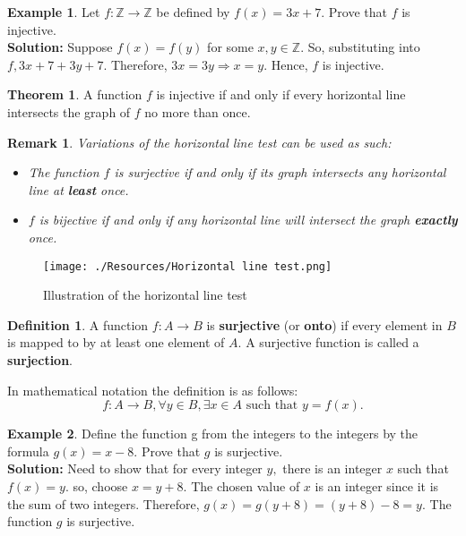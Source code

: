 \documentclass[12pt, a4paper]{article}
\newcommand{\bb}[1]{\mathbb{#1}}
\newcommand{\imply}{\Rightarrow}
\newtheorem*{remark}{Remark}
\theoremstyle{definition}
\newtheorem{definition}{Definition}[section]
\newtheorem{theorem}{Theorem}[section]
\newtheorem*{example}{Example}
\theoremstyle{plain}
\begin{document}
\begin{example}
Let $f : \bb{Z} \to \bb{Z}$ be defined by $f(x) = 3x + 7.$ Prove that $f$ is injective. \\
\textbf{Solution:} Suppose $f(x)=f(y)$ for some $x,y \in \bb{Z}.$ So, substituting into $f, 3x+7+3y+7.$ Therefore, $3x=3y \imply x=y.$ Hence, $f$ is injective. 
\end{example}

\begin{theorem}
A function $f$ is injective if and only if every horizontal line intersects the graph of $f$ no more than once.
\end{theorem}

\begin{remark}
Variations of the horizontal line test can be used as such:
\begin{itemize}

	\item The function $f$ is surjective if and only if its graph intersects any horizontal line at \textbf{least} once.

	\item $f$ is bijective if and only if any horizontal line will intersect the graph \textbf{exactly} once.

\end{itemize}
\end{remark}

\begin{figure}[H]
\centering
\texttt{[image: ./Resources/Horizontal line test.png]}
\caption{Illustration of the horizontal line test}
\label{fig:horizontal line test}
\end{figure}

\begin{definition}
A function $f : A \to B$ is \textbf{surjective} (or \textbf{onto}) if every element in $B$ is mapped to by at least one element of $A.$ A surjective function is called a \textbf{surjection}. 

In mathematical notation the definition is as follows: $$f:A\to B, \forall y \in B, \exists x \in A \text{ such that } y=f(x).$$
\end{definition}

\begin{example}
Define the function g from the integers to the integers by the formula $g(x) = x - 8.$ Prove that $g$ is surjective. \\
\textbf{Solution:} Need to show that for every integer $y,$ there is an integer $x$ such that $f(x)=y.$ so, choose $x=y+8.$ The chosen value of $x$ is an integer since it is the sum of two integers. Therefore, $g(x)=g(y+8)=(y+8)-8=y.$ The function $g$ is surjective.
\end{example}
\end{document}
